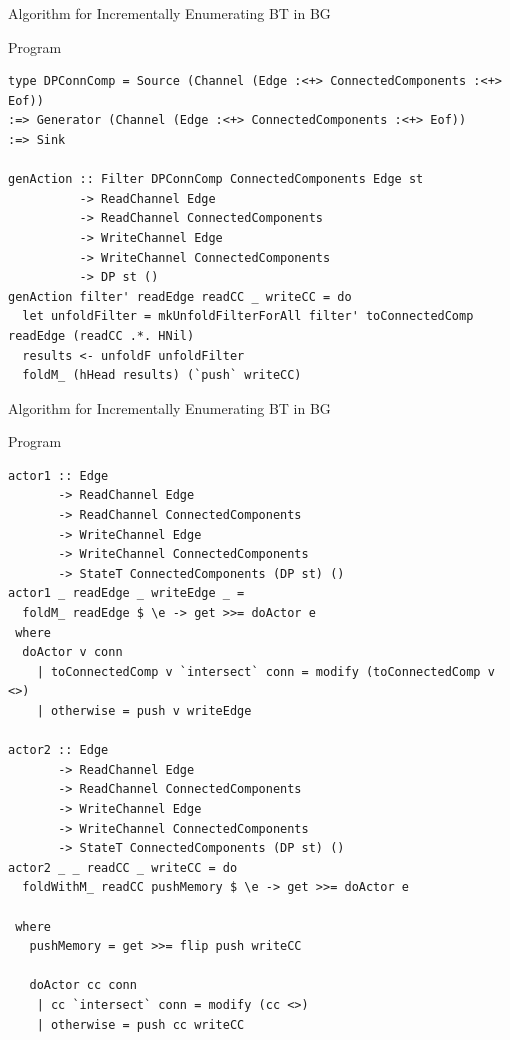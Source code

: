 \documentclass{beamer}
\begin{document}
  \begin{frame}[fragile]{Algorithm for Incrementally Enumerating BT in BG}
    \begin{block}{Program}
      \begin{verbatim}      
type DPConnComp = Source (Channel (Edge :<+> ConnectedComponents :<+> Eof))
:=> Generator (Channel (Edge :<+> ConnectedComponents :<+> Eof))
:=> Sink

genAction :: Filter DPConnComp ConnectedComponents Edge st
          -> ReadChannel Edge
          -> ReadChannel ConnectedComponents
          -> WriteChannel Edge
          -> WriteChannel ConnectedComponents
          -> DP st ()
genAction filter' readEdge readCC _ writeCC = do
  let unfoldFilter = mkUnfoldFilterForAll filter' toConnectedComp readEdge (readCC .*. HNil) 
  results <- unfoldF unfoldFilter
  foldM_ (hHead results) (`push` writeCC)
      \end{verbatim}
    \end{block}
  \end{frame}

  \begin{frame}[fragile]{Algorithm for Incrementally Enumerating BT in BG}
    \begin{block}{Program}
      \begin{verbatim}      
actor1 :: Edge
       -> ReadChannel Edge
       -> ReadChannel ConnectedComponents
       -> WriteChannel Edge
       -> WriteChannel ConnectedComponents
       -> StateT ConnectedComponents (DP st) ()
actor1 _ readEdge _ writeEdge _ = 
  foldM_ readEdge $ \e -> get >>= doActor e
 where
  doActor v conn
    | toConnectedComp v `intersect` conn = modify (toConnectedComp v <>)
    | otherwise = push v writeEdge

actor2 :: Edge
       -> ReadChannel Edge
       -> ReadChannel ConnectedComponents
       -> WriteChannel Edge
       -> WriteChannel ConnectedComponents
       -> StateT ConnectedComponents (DP st) ()
actor2 _ _ readCC _ writeCC = do 
  foldWithM_ readCC pushMemory $ \e -> get >>= doActor e

 where
   pushMemory = get >>= flip push writeCC

   doActor cc conn
    | cc `intersect` conn = modify (cc <>)
    | otherwise = push cc writeCC
      \end{verbatim}
    \end{block}
  \end{frame}
\end{document}
